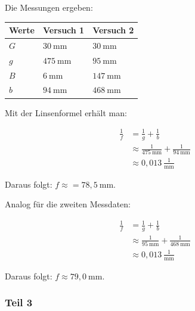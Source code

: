             Die Messungen ergeben:

            \begin{table}[h]
                \begin{center}
                    \begin{tabular}{|l|l|l|}
                        \hline
                        Werte & Versuch 1 & Versuch 2\\
                        \hline
                        $G$ & $30\ \mathrm{mm}$ & $30\ \mathrm{mm}$ \\
                        $g$ & $475\ \mathrm{mm}$ & $95\ \mathrm{mm}$ \\
                        $B$ & $6\ \mathrm{mm}$ & $147\ \mathrm{mm}$ \\
                        $b$ & $94\ \mathrm{mm}$ & $468\ \mathrm{mm}$\\
                        \hline
                    \end{tabular}
                \end{center}
            \end{table}

            Mit der Linsenformel erhält man:

            $$
            \begin{aligned}
                \frac{1}{f} &= \frac{1}{g} + \frac{1}{b}\\
                &\approx \frac{1}{475\ \mathrm{mm}} + \frac{1}{94\ \mathrm{mm}}\\
                &\approx 0,013\ \frac{1}{\mathrm{mm}}
            \end{aligned}
            $$

            Daraus folgt: $f \approx = 78,5\ \mathrm{mm}$.
            
            Analog für die zweiten Messdaten:

            $$
            \begin{aligned}
                \frac{1}{f} &= \frac{1}{g} + \frac{1}{b}\\
                &\approx \frac{1}{95\ \mathrm{mm}} + \frac{1}{468\ \mathrm{mm}}\\
                &\approx 0,013\ \frac{1}{\mathrm{mm}}
            \end{aligned}
            $$

            Daraus folgt: $f \approx 79,0\ \mathrm{mm}$.

        \subsubsection{Teil 3}
        
